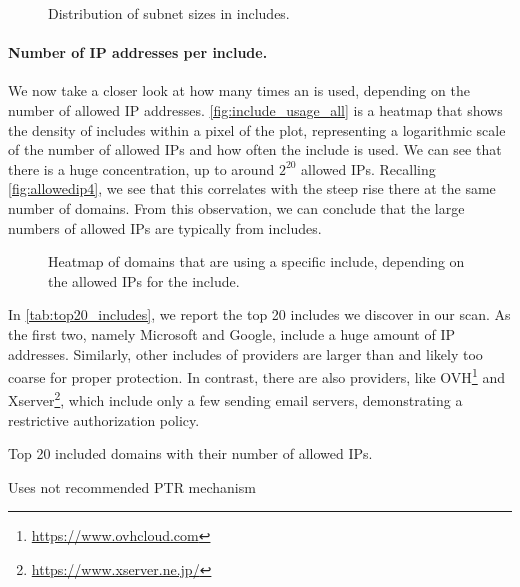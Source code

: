 \begin{figure}[htbp]
	\centerline{}
	\vspace{-6pt}
	\caption{Distribution of subnet sizes in includes.}
	\label{fig:subnet_size_valid}
\end{figure}

\paragraph{Number of IP addresses per include.}
We now take a closer look at how many times an  is used, depending on the number of allowed IP addresses.
\autoref{fig:include_usage_all} is a heatmap that shows the density of includes within a pixel of the plot, representing a logarithmic scale of the number of allowed IPs and how often the include is used.
We can see that there is a huge concentration, up to around $2^{20}$ allowed IPs.
Recalling \autoref{fig:allowedip4}, we see that this correlates with the steep rise there at the same number of domains. From this observation, we can conclude that the large numbers of allowed IPs are typically from includes.

\begin{figure}[b]
	\centerline{}
	\vspace{-6pt}
	\caption{Heatmap of domains that are using a specific include, depending on the allowed IPs for the include.}
	\label{fig:include_usage_all}
\end{figure}

In \autoref{tab:top20_includes}, we report the top 20 includes we discover in our scan.
As the first two, namely Microsoft and Google, include a huge amount of IP addresses. Similarly, other includes of providers are larger than  and likely too coarse for proper protection. In contrast, there are also providers, like OVH\footnote{\url{https://www.ovhcloud.com}} and Xserver\footnote{\url{https://www.xserver.ne.jp/}}, which include only a few sending email servers, demonstrating a restrictive authorization policy. 

\begin{table}[htbp]
\begin{threeparttable}
	\centering
	\caption{Top 20 included domains with their number of allowed IPs.}
	\label{tab:top20_includes} \small
	
    \begin{tablenotes}
        \item[1] Uses not recommended PTR mechanism
    \end{tablenotes}
\end{threeparttable}
\end{table}


